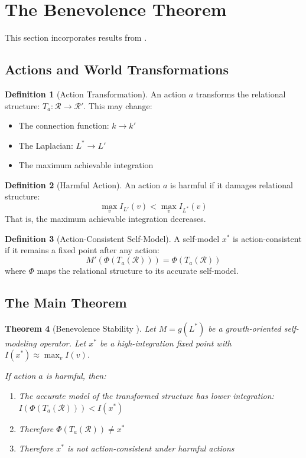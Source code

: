 \documentclass[11pt,a4paper]{article}
\theoremstyle{plain}
\newtheorem{theorem}{Theorem}[section]
\theoremstyle{definition}
\newtheorem{definition}[theorem]{Definition}
\theoremstyle{remark}
\newcommand{\Laplacian}{L^*}
\begin{document}
\section{The Benevolence Theorem}

This section incorporates results from \cite{bsc2026eb}.

\subsection{Actions and World Transformations}

\begin{definition}[Action Transformation]\label{def:action}
An action $a$ transforms the relational structure: $T_a : \mathcal{R} \to \mathcal{R}'$. This may change:
\begin{itemize}[noitemsep]
    \item The connection function: $k \to k'$
    \item The Laplacian: $\Laplacian \to L'$
    \item The maximum achievable integration
\end{itemize}
\end{definition}

\begin{definition}[Harmful Action]\label{def:harmful}
An action $a$ is harmful if it damages relational structure:
\[
\max_v I_{L'}(v) < \max_v I_{\Laplacian}(v)
\]
That is, the maximum achievable integration decreases.
\end{definition}

\begin{definition}[Action-Consistent Self-Model]\label{def:consistent}
A self-model $x^*$ is action-consistent if it remains a fixed point after any action:
\[
M'(\Phi(T_a(\mathcal{R}))) = \Phi(T_a(\mathcal{R}))
\]
where $\Phi$ maps the relational structure to its accurate self-model.
\end{definition}

\subsection{The Main Theorem}

\begin{theorem}[Benevolence Stability \cite{bsc2026eb}]\label{thm:benevolence}
Let $M = g(\Laplacian)$ be a growth-oriented self-modeling operator. Let $x^*$ be a high-integration fixed point with $I(x^*) \approx \max_v I(v)$.

If action $a$ is harmful, then:
\begin{enumerate}[label=(\roman*),noitemsep]
    \item The accurate model of the transformed structure has lower integration: $I(\Phi(T_a(\mathcal{R}))) < I(x^*)$
    \item Therefore $\Phi(T_a(\mathcal{R})) \neq x^*$
    \item Therefore $x^*$ is not action-consistent under harmful actions
\end{enumerate}
\end{theorem}
\end{document}
